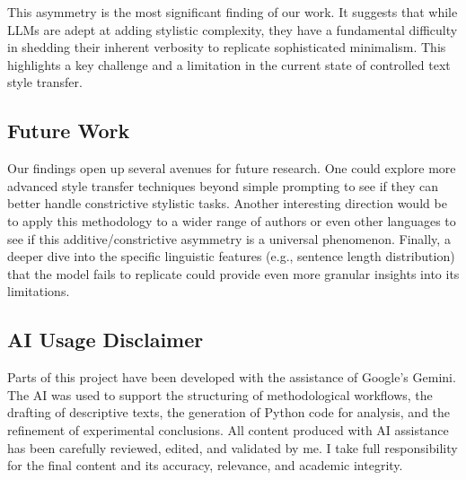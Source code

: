 \documentclass[sn-mathphys]{sn-jnl}%
\begin{document}
This asymmetry is the most significant finding of our work. It suggests that while LLMs are adept at adding stylistic complexity, they have a fundamental difficulty in shedding their inherent verbosity to replicate sophisticated minimalism. This highlights a key challenge and a limitation in the current state of controlled text style transfer.

\subsection{Future Work}\label{subsec4.1}
Our findings open up several avenues for future research. One could explore more advanced style transfer techniques beyond simple prompting to see if they can better handle constrictive stylistic tasks. Another interesting direction would be to apply this methodology to a wider range of authors or even other languages to see if this additive/constrictive asymmetry is a universal phenomenon. Finally, a deeper dive into the specific linguistic features (e.g., sentence length distribution) that the model fails to replicate could provide even more granular insights into its limitations.

\begin{appendices}

\section{AI Usage Disclaimer}\label{secA1}

Parts of this project have been developed with the assistance of Google's Gemini. The AI was used to support the structuring of methodological workflows, the drafting of descriptive texts, the generation of Python code for analysis, and the refinement of experimental conclusions. All content produced with AI assistance has been carefully reviewed, edited, and validated by me. I take full responsibility for the final content and its accuracy, relevance, and academic integrity.

\end{appendices}
\end{document}
